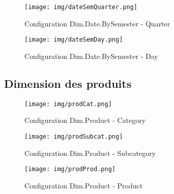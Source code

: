 \begin{figure}[H]
    \centering
    \texttt{[image: img/dateSemQuarter.png]}
    \caption{Configuration Dim.Date.BySemester - Quarter}
    \label{dateSemQuarter}
\end{figure}

\begin{figure}[H]
    \centering
    \texttt{[image: img/dateSemDay.png]}
    \caption{Configuration Dim.Date.BySemester - Day}
    \label{dateSemDay}
\end{figure}



\subsection{Dimension des produits}


\begin{figure}[H]
    \centering
    \texttt{[image: img/prodCat.png]}
    \caption{Configuration Dim.Product - Category}
    \label{prodCat}
\end{figure}

\begin{figure}[H]
    \centering
    \texttt{[image: img/prodSubcat.png]}
    \caption{Configuration Dim.Product - Subcategory}
    \label{prodSubcat}
\end{figure}

\begin{figure}[H]
    \centering
    \texttt{[image: img/prodProd.png]}
    \caption{Configuration Dim.Product - Product}
    \label{prodProd}
\end{figure}





